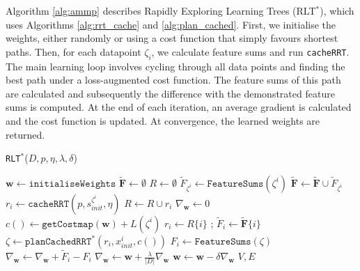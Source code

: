\documentclass[a4paper,11pt]{report}
\begin{document}
Algorithm \ref{alg:ammp} describes Rapidly Exploring Learning Trees (RLT$^*$), which uses  Algorithms \ref{alg:rrt_cache} and \ref{alg:plan_cached}. First, we initialise the weights, either randomly or using a cost function that simply favours shortest paths. Then, for each datapoint $\zeta_i$, we calculate feature sums and run \texttt{cacheRRT}. The main learning loop involves cycling through all data points and finding the best path under a loss-augmented cost function. The feature sums of this path are calculated and subsequently the difference with the demonstrated feature sums is computed. At the end of each iteration, an average gradient is calculated and the cost function is updated. At convergence, the learned weights are returned.




	\begin{algorithm}
  	\scriptsize
	\caption{\texttt{RLT$^*$}($D,p,\eta,\lambda,\delta$)\label{alg:ammp}}
	\begin{algorithmic}[1]
	\STATE $\mathbf{w} \gets \texttt{initialiseWeights}$
	\STATE $\mathbf{\tilde{F}} \gets \emptyset$
	\STATE $R \gets \emptyset$
	\STATE $\tilde{F}_{\zeta^i} \gets \texttt{FeatureSums}(\zeta^i)$
	\STATE $\mathbf{\tilde{F}} \gets \mathbf{\tilde{F}} \cup \tilde{F}_{\zeta^i}$
	\STATE $r_i \gets \texttt{cacheRRT}(p,s_{init}^{\zeta^i},\eta)$
	\STATE $R \gets R \cup r_i $
	\ENDFOR
	\REPEAT
	\STATE $\nabla_{\mathbf{w}}\gets 0$
	\STATE $c() \gets \texttt{getCostmap}(\mathbf{w}) + L(\zeta^i)$ 
	\STATE $r_i \gets R\{i\}$ ;	$\tilde{F}_i \gets \mathbf{\tilde{F}}\{i\}$ 
	\STATE $\zeta \gets \texttt{planCachedRRT}^*(r_i,x^i_{init},c())$
	\STATE $F_i \gets \texttt{FeatureSums}(\zeta)$
	\STATE $\nabla_{\mathbf{w}} \gets \nabla_{\mathbf{w}} + \tilde{F}_i - F_i $
	\ENDFOR
	\STATE $\nabla_{\mathbf{w}} \gets \mathbf{w} + \frac{\lambda}{|D|}\nabla_{\mathbf{w}} $
	\STATE $\mathbf{w} \gets \mathbf{w} - \delta\nabla_{\mathbf{w}} $
	\RETURN $V,E$

	\end{algorithmic}
	\end{algorithm}
\end{document}
